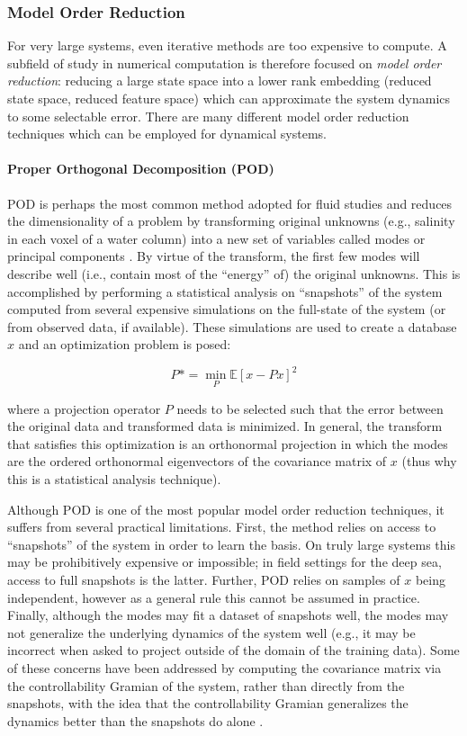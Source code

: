 \subsubsection{Model Order Reduction}
For very large systems, even iterative methods are too expensive to compute. A subfield of study in numerical computation is therefore focused on \emph{model order reduction}: reducing a large state space into a lower rank embedding (reduced state space, reduced feature space) which can approximate the system dynamics to some selectable error. There are many different model order reduction techniques which can be employed for dynamical systems.

\paragraph{Proper Orthogonal Decomposition (POD)} POD is perhaps the most common method adopted for fluid studies and reduces the dimensionality of a problem by transforming original unknowns (e.g., salinity in each voxel of a water column) into a new set of variables called modes or principal components \autocite{lassila2014model}. By virtue of the transform, the first few modes will describe well (i.e., contain most of the ``energy'' of) the original unknowns. This is accomplished by performing a statistical analysis on ``snapshots'' of the system computed from several expensive simulations on the full-state of the system (or from observed data, if available). These simulations are used to create a database $x$  and an optimization problem is posed:

\begin{equation}
	P* = \min_P\mathbb{E}[x - Px]^2
\end{equation}

\noindent where a projection operator $P$ needs to be selected such that the error between the original data and transformed data is minimized. In general, the transform that satisfies this optimization is an orthonormal projection in which the modes are the ordered orthonormal eigenvectors of the covariance matrix of $x$ (thus why this is a statistical analysis technique).

Although POD is one of the most popular model order reduction techniques, it suffers from several practical limitations. First, the method relies on access to ``snapshots'' of the system in order to learn the basis.  On truly large systems this may be prohibitively expensive or impossible; in field settings for the deep sea, access to full snapshots is the latter. Further, POD relies on samples of $x$ being independent, however as a general rule this cannot be assumed in practice. Finally, although the modes may fit a dataset of snapshots well, the modes may not generalize the underlying dynamics of the system well (e.g., it may be incorrect when asked to project outside of the domain of the training data). Some of these concerns have been addressed by computing the covariance matrix via the controllability Gramian of the system, rather than directly from the snapshots, with the idea that the controllability Gramian generalizes the dynamics better than the snapshots do alone \autocite{georges1995use,zhao2019networks}.


